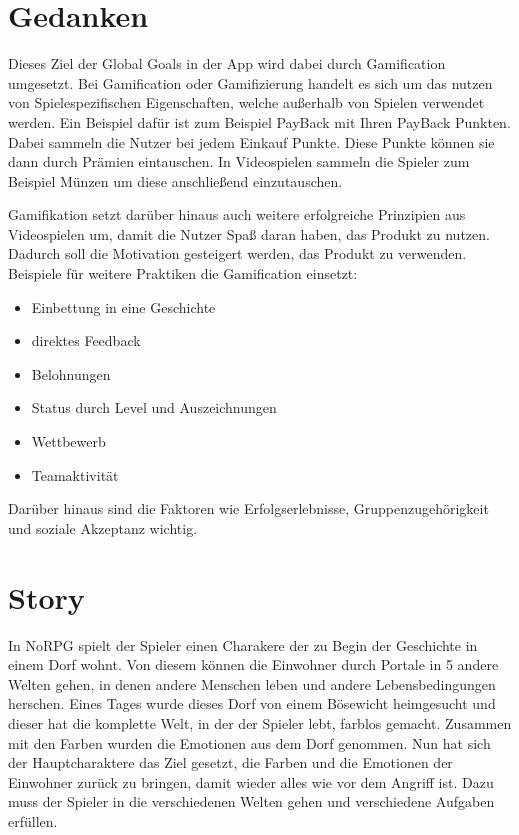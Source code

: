 	
\section{Gedanken}

Dieses Ziel der Global Goals in der App wird dabei durch Gamification umgesetzt. Bei Gamification oder Gamifizierung handelt es sich um das nutzen von Spielespezifischen Eigenschaften, welche außerhalb von Spielen verwendet werden. Ein Beispiel dafür ist zum Beispiel PayBack mit Ihren PayBack Punkten. Dabei sammeln die Nutzer bei jedem Einkauf Punkte. Diese Punkte können sie dann durch Prämien eintauschen. In Videospielen sammeln die Spieler zum Beispiel Münzen um diese anschließend einzutauschen. 

Gamifikation setzt darüber hinaus auch weitere erfolgreiche Prinzipien aus Videospielen um, damit die Nutzer Spaß daran haben, das Produkt zu nutzen. Dadurch soll die Motivation gesteigert werden, das Produkt zu verwenden. Beispiele für weitere Praktiken die Gamification einsetzt:
\begin{itemize}
\item Einbettung in eine Geschichte
\item direktes Feedback
\item Belohnungen
\item Status durch Level und Auszeichnungen
\item Wettbewerb
\item Teamaktivität
\end{itemize}

Darüber hinaus sind die Faktoren wie Erfolgserlebnisse, Gruppenzugehörigkeit und soziale Akzeptanz wichtig.

	
\section{Story}

In NoRPG spielt der Spieler einen Charakere der zu Begin der Geschichte in einem Dorf wohnt. Von diesem können die Einwohner durch Portale in 5 andere Welten gehen, in denen andere Menschen leben und andere Lebensbedingungen herschen. Eines Tages wurde dieses Dorf von einem Bösewicht heimgesucht und dieser hat die komplette Welt, in der der Spieler lebt, farblos gemacht. Zusammen mit den Farben wurden die Emotionen aus dem Dorf genommen. Nun hat sich der Hauptcharaktere das Ziel gesetzt, die Farben und die Emotionen der Einwohner zurück zu bringen, damit wieder alles wie vor dem Angriff ist. Dazu muss der Spieler in die verschiedenen Welten gehen und verschiedene Aufgaben erfüllen.

